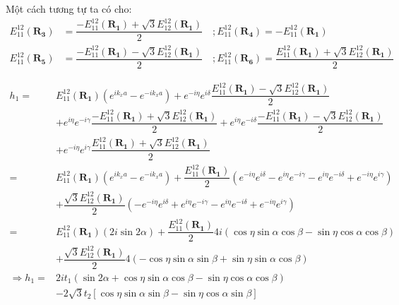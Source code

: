 \documentclass{article}
\begin{document}
Một cách tương tự ta có cho:
\begin{align*}
	E_{11}^{12}(\mathbf{R_3}) & =  \dfrac{ -E_{11}^{12}(\mathbf{R_1}) + \sqrt{3} E_{12}^{12}(\mathbf{R_1})}{2} \quad ;  E_{11}^{12}(\mathbf{R_4}) = - E_{11}^{12}(\mathbf{R_1})                                                 \\
	E_{11}^{12}(\mathbf{R_5}) & =  \dfrac{ -E_{11}^{12}(\mathbf{R_1}) - \sqrt{3} E_{12}^{12}(\mathbf{R_1})}{2} \quad ; E_{11}^{12}(\mathbf{R_6})  =  \dfrac{ E_{11}^{12}(\mathbf{R_1}) + \sqrt{3} E_{12}^{12}(\mathbf{R_1})}{2}
\end{align*}

\begin{align*}
	h_1  =           & E_{11}^{12}(\mathbf{R_1})\left( e^{ik_x a} - e^{-ik_x a} \right) + e^{-i\eta} e^{i\delta} \dfrac{E_{11}^{12}(\mathbf{R_1}) - \sqrt{3}E_{12}^{12}(\mathbf{R_1})}{2}                                                      \\
	                 & + e^{i\eta} e^{-i\gamma} \dfrac{ -E_{11}^{12}(\mathbf{R_1}) + \sqrt{3} E_{12}^{12}(\mathbf{R_1})}{2} + e^{i\eta} e^{-i\delta} \dfrac{ -E_{11}^{12}(\mathbf{R_1}) - \sqrt{3} E_{12}^{12}(\mathbf{R_1})}{2}               \\
	                 & + e^{-i\eta} e^{i\gamma} \dfrac{ E_{11}^{12}(\mathbf{R_1}) + \sqrt{3} E_{12}^{12}(\mathbf{R_1})}{2}                                                                                                                     \\
	=                & E_{11}^{12}(\mathbf{R_1})\left( e^{ik_x a} - e^{-ik_x a} \right) + \dfrac{E_{11}^{12}(\mathbf{R_1})}{2}\left( e^{-i\eta} e^{i\delta} - e^{i\eta} e^{-i\gamma} - e^{i\eta} e^{-i\delta} + e^{-i\eta} e^{i\gamma} \right) \\
	                 & + \dfrac{\sqrt{3}E_{12}^{12}(\mathbf{R_1})}{2}\left( -e^{-i\eta} e^{i\delta} + e^{i\eta} e^{-i\gamma} - e^{i\eta} e^{-i\delta} + e^{-i\eta} e^{i\gamma} \right)                                                         \\
	=                & E_{11}^{12}(\mathbf{R_1})\left( 2i\sin2\alpha \right) + \dfrac{E_{11}^{12}(\mathbf{R_1})}{2}4i(\cos\eta\sin\alpha\cos\beta - \sin\eta\cos\alpha\cos\beta)                                                               \\
	                 & +\dfrac{\sqrt{3}E_{12}^{12}(\mathbf{R_1})}{2}4(-\cos\eta\sin\alpha\sin\beta + \sin\eta\sin\alpha\cos\beta)                                                                                                              \\
	\Rightarrow h_1= & 2 i t_1 (\sin 2\alpha + \cos\eta\sin\alpha\cos\beta -    \sin\eta\cos\alpha\cos\beta )                                                                                                                                  \\
	                 & - 2\sqrt{3}t_2\left[ \cos\eta\sin\alpha\sin\beta - \sin\eta\cos\alpha\sin\beta  \right]
\end{align*}
\end{document}
